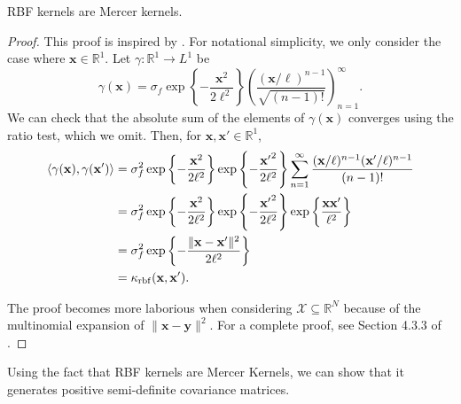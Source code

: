 \begin{theorem}
    \label{thm:rbf-mercer}
    RBF kernels are Mercer kernels.
\end{theorem}
\begin{proof}
    This proof is inspired by \cite{shashua2009}.
    For notational simplicity, we only consider the case where $\mathbf{x} \in \mathbb{R}^{1}$.
    Let $\gamma : \mathbb{R}^{1} \to L^1$ be
    \begin{equation*}
        \gamma(\mathbf{x}) = \sigma_f \exp\left\{- \frac{\mathbf{x}^2}{2\ell^2}\right\} \left(\frac{ (\mathbf{x} / \ell)^{n - 1} }{ \sqrt{(n - 1)!} }\right)_{n=1}^{\infty}.
    \end{equation*}
    We can check that the absolute sum of the elements of $\gamma(\mathbf{x})$ converges using the ratio test, which we omit.
    Then, for $\mathbf{x}, \mathbf{x'} \in \mathbb{R}^{1}$,
    \begin{align*}
        \langle \gamma(\mathbf{x}), \gamma(\mathbf{x'}) \rangle
        & = \sigma_f^2
        \exp \left\{ -\frac{\mathbf{x}^2}{2\ell^2} \right\}
        \exp \left\{ -\frac{ \mathbf{x'}^2}{2\ell^2} \right\}
        \sum\limits_{n=1}^{\infty}
        \frac{ (\mathbf{x}/\ell)^{n - 1} (\mathbf{x'}/\ell)^{n - 1}}{ (n - 1)! } \\
        & = \sigma_f^2
        \exp \left\{ -\frac{ \mathbf{x}^2}{2\ell^2} \right\}
        \exp \left\{ -\frac{ \mathbf{x'}^2}{2\ell^2} \right\}
        \exp \left\{ \frac{\mathbf{x} \mathbf{x'}}{ \ell^2} \right\} \\
        & = \sigma_f^2 \exp \left\{ -\frac{ \lVert \mathbf{x} - \mathbf{x'} \rVert^2 }{ 2\ell^2 } \right\} \\
        & = \kappa_{\mathrm{rbf}}(\mathbf{x}, \mathbf{x'}).
    \end{align*}

    The proof becomes more laborious when considering $\mathcal{X} \subseteq \mathbb{R}^{N}$ because of the multinomial expansion of $\lVert \mathbf{x} - \mathbf{y} \rVert^2$.
    For a complete proof, see Section 4.3.3 of \cite{shashua2009}.
\end{proof}

Using the fact that RBF kernels are Mercer Kernels, we can show that it generates positive semi-definite covariance matrices.

